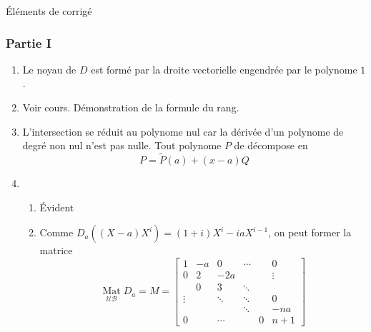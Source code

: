 \'Eléments de corrigé
\subsubsection*{Partie I}
\begin{enumerate}
\item Le noyau de $D$ est formé par la droite vectorielle engendrée par le polynome $1$.
\item Voir cours. Démonstration de la formule du rang.
\item L'intersection se réduit au polynome nul car la dérivée d'un polynome de degré non nul n'est pas nulle. Tout polynome $P$ de décompose en
\[P=\tilde{P}(a)+(x-a)Q\]
\item \begin{enumerate}
\item \'Evident
\item Comme $D_a((X-a)X^i)=(1+i)X^i-iaX^{i-1}$, on peut former la matrice
\begin{displaymath}
\underset{\mathcal{U}\mathcal{B}}{\mathop{\mathrm{Mat}}}D_a=M=
\left[ 
\begin{array}{llllll}
1       & -a & 0      & \cdots &   & 0  \\ 
0       & 2  & -2a    &        &   & \vdots \\ 
        & 0  & 3      & \ddots &   &  \\ 
\vdots  &    & \ddots & \ddots &   & 0 \\ 
        &    &        & \ddots &   & -na \\ 
0       &    & \cdots &        & 0 & n+1
\end{array}
\right] 
\end{displaymath}

\end{enumerate}

\end{enumerate}
